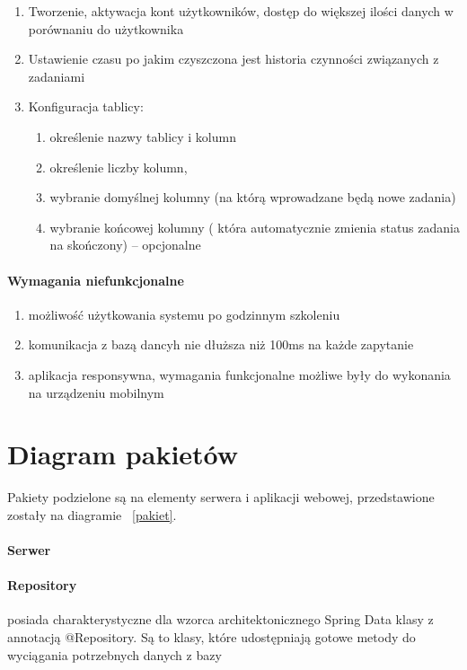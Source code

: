 		\begin{enumerate} 
		\item Tworzenie, aktywacja kont użytkowników, dostęp do większej ilości danych w porównaniu do użytkownika
		\item Ustawienie czasu po jakim czyszczona jest historia czynności związanych z zadaniami
		\item Konfiguracja tablicy:
	\begin{enumerate}[leftmargin=3em]
			\item określenie nazwy tablicy i kolumn
			\item określenie liczby kolumn, 
			\item wybranie domyślnej kolumny (na którą wprowadzane będą nowe zadania)
			\item wybranie końcowej kolumny ( która automatycznie zmienia status zadania na skończony) –  opcjonalne
		\end{enumerate}

\end{enumerate}

\paragraph{Wymagania niefunkcjonalne}
\begin{enumerate}
	\item możliwość użytkowania systemu po godzinnym szkoleniu
	\item komunikacja z bazą dancyh nie dłuższa niż 100ms na każde zapytanie 
	\item aplikacja responsywna, wymagania funkcjonalne możliwe były do wykonania na urządzeniu mobilnym
\end{enumerate}

\clearpage
\section{Diagram pakietów}

Pakiety podzielone są na elementy serwera i aplikacji webowej, przedstawione zostały na diagramie ~\ref{pakiet}.
\paragraph{Serwer }
\paragraph{Repository}
posiada charakterystyczne dla wzorca architektonicznego Spring Data klasy z annotacją @Repository. Są to klasy, które udostępniają gotowe metody do
wyciągania potrzebnych danych z bazy

